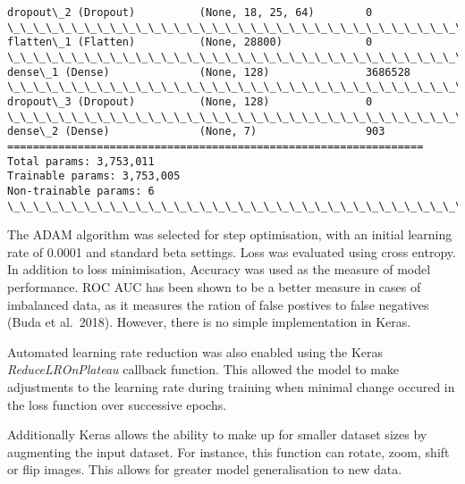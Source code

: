 \documentclass[11pt]{article}
\begin{document}
\begin{Verbatim}[commandchars=\\\{\}]
dropout\_2 (Dropout)          (None, 18, 25, 64)        0         
\_\_\_\_\_\_\_\_\_\_\_\_\_\_\_\_\_\_\_\_\_\_\_\_\_\_\_\_\_\_\_\_\_\_\_\_\_\_\_\_\_\_\_\_\_\_\_\_\_\_\_\_\_\_\_\_\_\_\_\_\_\_\_\_\_
flatten\_1 (Flatten)          (None, 28800)             0         
\_\_\_\_\_\_\_\_\_\_\_\_\_\_\_\_\_\_\_\_\_\_\_\_\_\_\_\_\_\_\_\_\_\_\_\_\_\_\_\_\_\_\_\_\_\_\_\_\_\_\_\_\_\_\_\_\_\_\_\_\_\_\_\_\_
dense\_1 (Dense)              (None, 128)               3686528   
\_\_\_\_\_\_\_\_\_\_\_\_\_\_\_\_\_\_\_\_\_\_\_\_\_\_\_\_\_\_\_\_\_\_\_\_\_\_\_\_\_\_\_\_\_\_\_\_\_\_\_\_\_\_\_\_\_\_\_\_\_\_\_\_\_
dropout\_3 (Dropout)          (None, 128)               0         
\_\_\_\_\_\_\_\_\_\_\_\_\_\_\_\_\_\_\_\_\_\_\_\_\_\_\_\_\_\_\_\_\_\_\_\_\_\_\_\_\_\_\_\_\_\_\_\_\_\_\_\_\_\_\_\_\_\_\_\_\_\_\_\_\_
dense\_2 (Dense)              (None, 7)                 903       
=================================================================
Total params: 3,753,011
Trainable params: 3,753,005
Non-trainable params: 6
\_\_\_\_\_\_\_\_\_\_\_\_\_\_\_\_\_\_\_\_\_\_\_\_\_\_\_\_\_\_\_\_\_\_\_\_\_\_\_\_\_\_\_\_\_\_\_\_\_\_\_\_\_\_\_\_\_\_\_\_\_\_\_\_\_

    \end{Verbatim}

    The ADAM algorithm was selected for step optimisation, with an initial
learning rate of 0.0001 and standard beta settings. Loss was evaluated
using cross entropy. In addition to loss minimisation, Accuracy was used
as the measure of model performance. ROC AUC has been shown to be a
better measure in cases of imbalanced data, as it measures the ration of
false postives to false negatives (Buda et al.~2018). However, there is
no simple implementation in Keras.

Automated learning rate reduction was also enabled using the Keras
\emph{ReduceLROnPlateau} callback function. This allowed the model to
make adjustments to the learning rate during training when minimal
change occured in the loss function over successive epochs.

Additionally Keras allows the ability to make up for smaller dataset
sizes by augmenting the input dataset. For instance, this function can
rotate, zoom, shift or flip images. This allows for greater model
generalisation to new data.
\end{document}
